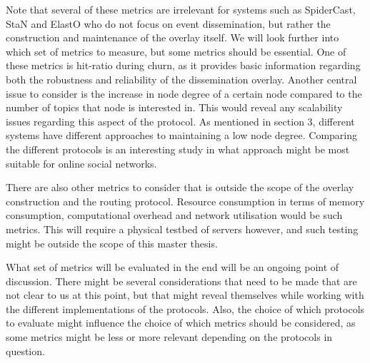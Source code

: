     Note that several of these metrics are irrelevant for systems such
    as SpiderCast, StaN and ElastO who do not focus on event dissemination, but
    rather the construction and maintenance of the overlay itself.  We
    will look further into which set of metrics to measure, but some
    metrics should be essential. One of these metrics is hit-ratio
    during churn, as it provides basic information regarding both the
    robustness and reliability of the dissemination overlay. Another
    central issue to consider is the increase in node degree of a
    certain node compared to the number of topics that node is
    interested in. This would reveal any scalability issues regarding
    this aspect of the protocol. As mentioned in section 3, different
    systems have different approaches to maintaining a low node degree.
    Comparing the different protocols is an interesting study in what approach
    might be most suitable for online social networks.

    There are also other metrics to consider that is outside the scope
    of the overlay construction and the routing protocol. Resource
    consumption in terms of memory consumption, computational overhead
    and network utilisation would be such metrics. This will require a
    physical testbed of servers however, and such testing might be
    outside the scope of this master thesis.

    What set of metrics will be evaluated in the end will be an ongoing
    point of discussion. There might be several considerations that need
    to be made that are not clear to us at this point, but that might
    reveal themselves while working with the different implementations
    of the protocols. Also, the choice of which protocols to evaluate
    might influence the choice of which metrics should be considered, as
    some metrics might be less or more relevant depending on the
    protocols in question.


